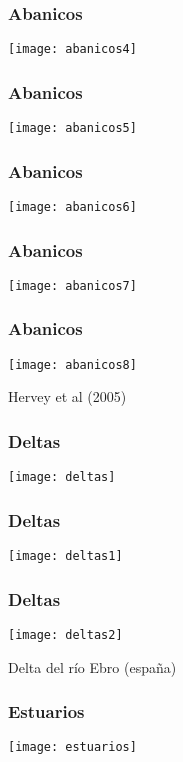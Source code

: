 \documentclass{beamer}
\begin{document}
\begin{frame}
\frametitle{Abanicos}
\begin{center}
   	\texttt{[image: abanicos4]}
\end{center}
\end{frame}
\begin{frame}
\frametitle{Abanicos}
\begin{center}
   	\texttt{[image: abanicos5]}
\end{center}
\end{frame}
\begin{frame}
\frametitle{Abanicos}
\begin{center}
   	\texttt{[image: abanicos6]}
\end{center}
\end{frame}
\begin{frame}
\frametitle{Abanicos}
\begin{center}
   	\texttt{[image: abanicos7]}
\end{center}
\end{frame}
\begin{frame}
\frametitle{Abanicos}
\begin{center}
   	\texttt{[image: abanicos8]}
\end{center}
\tiny{Hervey et al (2005)}
\end{frame}
\begin{frame}
\frametitle{Deltas}
\begin{center}
   	\texttt{[image: deltas]}
\end{center}
\end{frame}
\begin{frame}
\frametitle{Deltas}
\begin{center}
   	\texttt{[image: deltas1]}
\end{center}
\end{frame}
\begin{frame}
\frametitle{Deltas}
\begin{center}
   	\texttt{[image: deltas2]}
\end{center}
\tiny{Delta del río Ebro (españa)}
\end{frame}
\begin{frame}
\frametitle{Estuarios}
\begin{center}
   	\texttt{[image: estuarios]}
\end{center}
\end{frame}
\end{document}
